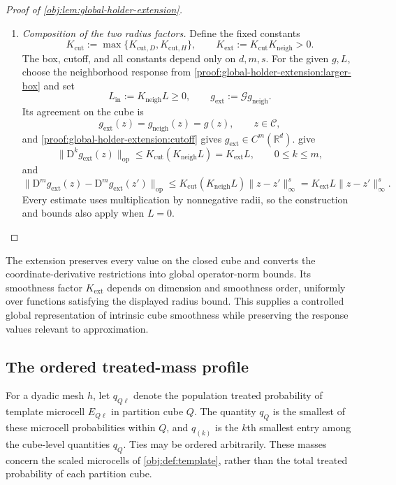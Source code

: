 \documentclass[11pt]{article}
\begin{document}
\begin{proof}[Proof of \cref{obj:lem:global-holder-extension}]
\begin{enumerate}
\item \emph{Composition of the two radius factors.}
Define the fixed constants
\[
K_{\mathrm{cut}}:=\max\{K_{\mathrm{cut},D},K_{\mathrm{cut},H}\},
\qquad
K_{\mathrm{ext}}:=K_{\mathrm{cut}}K_{\mathrm{neigh}}>0.
\]
The box, cutoff, and all constants depend only on \(d,m,s\). For the given \(g,L\), choose the neighborhood response from \cref{proof:global-holder-extension:larger-box} and set
\[
L_{\mathrm{in}}:=K_{\mathrm{neigh}}L\ge0,
\qquad
g_{\mathrm{ext}}:=\mathscr G g_{\mathrm{neigh}}.
\]
Its agreement on the cube is
\[
g_{\mathrm{ext}}(z)=g_{\mathrm{neigh}}(z)=g(z),
\qquad z\in\mathcal C,
\]
and \cref{proof:global-holder-extension:cutoff} gives \(g_{\mathrm{ext}}\in C^m(\mathbb R^d)\).  give
\[
\|\mathrm D^k g_{\mathrm{ext}}(z)\|_{\mathrm{op}}
\le K_{\mathrm{cut}}(K_{\mathrm{neigh}}L)
=K_{\mathrm{ext}}L,
\qquad 0\le k\le m,
\]
and
\[
\|\mathrm D^m g_{\mathrm{ext}}(z)-\mathrm D^m g_{\mathrm{ext}}(z')\|_{\mathrm{op}}
\le K_{\mathrm{cut}}(K_{\mathrm{neigh}}L)\|z-z'\|_\infty^s
=K_{\mathrm{ext}}L\|z-z'\|_\infty^s.
\]
Every estimate uses multiplication by nonnegative radii, so the construction and bounds also apply when \(L=0\).
\end{enumerate}
\end{proof}

The extension preserves every value on the closed cube and converts the coordinate-derivative restrictions into global operator-norm bounds. Its smoothness factor \(K_{\mathrm{ext}}\) depends on dimension and smoothness order, uniformly over functions satisfying the displayed radius bound. This supplies a controlled global representation of intrinsic cube smoothness while preserving the response values relevant to approximation.

\subsection{The ordered treated-mass profile}

For a dyadic mesh \(h\), let \(q_{Q\ell}\) denote the population treated probability of template microcell \(E_{Q\ell}\) in partition cube \(Q\). The quantity \(q_Q\) is the smallest of these microcell probabilities within \(Q\), and \(q_{(k)}\) is the \(k\)th smallest entry among the cube-level quantities \(q_Q\). Ties may be ordered arbitrarily. These masses concern the scaled microcells of \cref{obj:def:template}, rather than the total treated probability of each partition cube.
\end{document}
